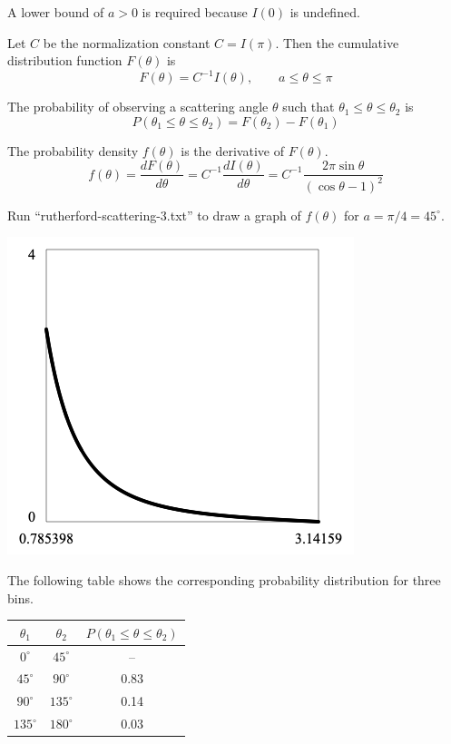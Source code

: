 \documentclass[12pt]{article}
\begin{document}
\noindent
A lower bound of $a>0$ is required because $I(0)$ is undefined.

\bigskip
\noindent
Let $C$ be the normalization constant $C=I(\pi)$.
Then the cumulative distribution function $F(\theta)$ is
\begin{equation*}
F(\theta)=C^{-1}I(\theta),
\qquad a\le\theta\le\pi
\end{equation*}

\noindent
The probability of observing a scattering angle $\theta$ such that $\theta_1\le\theta\le\theta_2$ is
\begin{equation*}
P(\theta_1\le\theta\le\theta_2)=F(\theta_2)-F(\theta_1)
\end{equation*}

\noindent
The probability density $f(\theta)$ is the derivative of $F(\theta)$.
\begin{equation*}
f(\theta)=\frac{dF(\theta)}{d\theta}=C^{-1}\frac{dI(\theta)}{d\theta}
=C^{-1}\frac{2\pi\sin\theta}{(\cos\theta-1)^2}
\end{equation*}

\noindent
Run ``rutherford-scattering-3.txt'' to draw a graph of $f(\theta)$ for $a=\pi/4=45^\circ$.

\begin{center}
\includegraphics[scale=0.5]{rutherford-scattering-1.png}
\end{center}

\noindent
The following table shows the corresponding probability distribution for three bins.

\begin{center}
\begin{tabular}{|c|c|c|}
\hline
$\theta_1$ & $\theta_2$ & $P(\theta_1\le\theta\le\theta_2)$\\
\hline
$0^\circ$ & $45^\circ$ & -- \\
$45^\circ$ & $90^\circ$ & 0.83 \\
$90^\circ$ & $135^\circ$ & 0.14 \\
$135^\circ$ & $180^\circ$ & 0.03 \\
\hline
\end{tabular}
\end{center}
\end{document}
